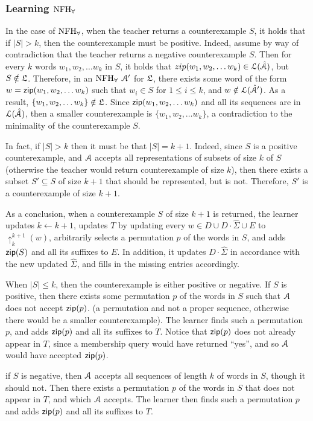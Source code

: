 \subsubsection{Learning $\textrm{NFH}_{\forall}$}

In the case of $\textrm{NFH}_{\forall}$, when the teacher returns a counterexample $S$, it holds that if $|S|> k$, then the counterexample must be positive. Indeed, assume by way of contradiction that the teacher returns a negative counterexample $S$. Then for every $k$ words $w_1,w_2,\ldots w_k$ in $S$, it holds that $zip(w_1,w_2,\ldots w_k)\in \mathcal{L}(\hat{\mathcal{A}})$, but $S\notin \mathfrak{L}$. Therefore, in an $\textrm{NFH}_{\forall}$ $\mathcal{A}'$ for $\mathfrak{L}$, there exists some word of the form $w = \mathsf{zip}(w_1,w_2,\ldots w_k)$ such that $w_i\in S$ for $1\leq i \leq k$, and $w\notin \mathcal{L}(\hat{\mathcal{A}}')$. As a result, $\{w_1,w_2,\ldots w_k\}\notin \mathfrak{L}$. Since $\mathsf{zip}(w_1,w_2,\ldots w_k)$ and all its sequences are in $\mathcal{L}(\hat{\mathcal{A}})$, then a smaller counterexample is $\{w_1,w_2,\ldots w_k\}$, a contradiction to the minimality of the counterexample $S$. 

In fact, if $|S|>k$ then it must be that $|S| = k+1$. Indeed, since $S$ is a positive counterexample, and $\mathcal{A}$ accepts all representations of subsets of size $k$ of $S$ (otherwise the teacher would return counterexample of size $k$), then there exists a subset $S'\subseteq S$ of size $k+1$ that should be represented, but is not. Therefore, $S'$ is a counterexample of size $k+1$.

As a conclusion, when a counterexample $S$ of size $k+1$ is returned, the learner updates $k\leftarrow k+1$, updates $T$ by updating every $w\in D\cup D\cdot {\hat\Sigma} \cup E$ to $\uparrow_k^{k+1}(w)$, arbitrarily selects a permutation $p$ of the words in $S$, and adds  $\mathsf{zip}(S)$ and all its suffixes to $E$.
In addition, it updates $D\cdot\hat\Sigma$ in accordance with the new updated $\hat\Sigma$, and fills in the missing entries accordingly.  

When $|S| \leq k$, then the counterexample is either positive or negative.
If $S$ is positive, then there exists some permutation $p$ of the words in $S$ such that $\mathcal{A}$ does not accept $\mathsf{zip}(p)$. (a permutation and not a proper sequence, otherwise there would be a smaller counterexample). The learner finds such a permutation $p$, and adds $\mathsf{zip}(p)$ and all its suffixes to $T$. Notice that $\mathsf{zip}(p)$ does not already appear in $T$, since a membership query would have returned ``yes'', and so $\mathcal{A}$ would have accepted $\mathsf{zip}(p)$.

if $S$ is negative, then $\mathcal{A}$ accepts all sequences of length $k$ of words in $S$, though it should not.
Then there exists a permutation $p$ of the words in $S$ that does not appear in $T$, and which $\mathcal{A}$ accepts. The learner then finds such a permutation $p$ and adds $\mathsf{zip}(p)$ and all its suffixes to $T$.

